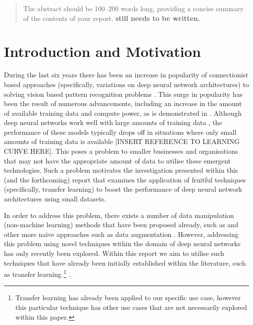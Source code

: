 \documentclass{article}
\def\studentNumber{s1, s2, s3}
\begin{document}
 

\twocolumn[
\mlptitle{MLP Coursework 3: Project Interim Report}

\centerline{\studentNumber}

\vskip 7mm
]

\begin{abstract} 
The abstract should be 100--200 words long,  providing a concise summary of the contents of your report. \textbf{still needs to be written.}
\end{abstract} 

\section{Introduction and Motivation}
\label{sec:intro}

During the last six years there has been an increase in popularity of connectionist based approaches (specifically, variations on deep neural network architectures) to solving vision based pattern recognition problems \cite{dinsmore2014symbolic}. This surge in popularity has been the result of numerous advancements, including an increase in the amount of available training data and compute power, as is demonstrated in \cite{krizhevsky2012imagenet} \cite{Szegedy_2015_CVPR} \cite{simonyan2014very}. Although deep neural networks work well with large amounts of training data \cite{lotsDataAndrew}, the performance of these models typically drops off in situations where only small amounts of training data is available [INSERT REFERENCE TO LEARNING CURVE HERE]. This poses a problem to smaller businesses and organisations that may not have the appropriate amount of data to utilise these emergent technologies. Such a problem motivates the investigation presented within this (and the forthcoming) report that examines the application of fruitful techniques (specifically, transfer learning) to boost the performance of deep neural network architectures using small datasets.

In order to address this problem, there exists a number of data manipulation (non-machine learning) methods that have been proposed already, such as \cite{hu2018frankenstein} and other more naive approaches such as data augmentation \cite{krizhevsky2012imagenet}. However, addressing this problem using novel techniques within the domain of deep neural networks has only recently been explored. Within this report we aim to utilise such techniques that have already been initially established within the literature, such as transfer learning \footnote{Transfer learning has already been applied to our specific use case, however this particular technique has other use cases that are not necessarily explored within this paper.} \cite{oquab2014learning}.
\end{document}
